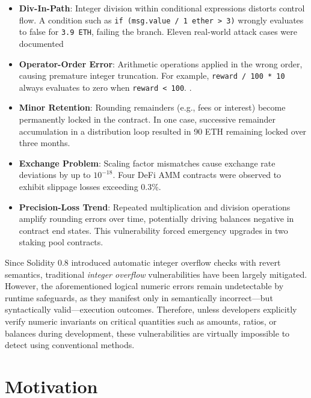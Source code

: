 \documentclass[10pt, conference]{IEEEtran}
\begin{document}
\begin{itemize}
    \item \textbf{Div-In-Path}: Integer division within conditional expressions distorts control flow.  
    A condition such as \texttt{if (msg.value / 1 ether > 3)} wrongly evaluates to false for \texttt{3.9 ETH}, failing the branch. Eleven real-world attack cases were documented
    
    \item \textbf{Operator-Order Error}: Arithmetic operations applied in the wrong order, causing premature integer truncation.  
    For example, \texttt{reward / 100 * 10} always evaluates to zero when \texttt{reward < 100}.    
    .
    
    \item \textbf{Minor Retention}: Rounding remainders (e.g., fees or interest) become permanently locked in the contract.  
    In one case, successive remainder accumulation in a distribution loop resulted in 90 ETH remaining locked over three months.
    
    \item \textbf{Exchange Problem}: Scaling factor mismatches cause exchange rate deviations by up to \(10^{-18}\).  
    Four DeFi AMM contracts were observed to exhibit slippage losses exceeding 0.3\%.
    
    \item \textbf{Precision-Loss Trend}: Repeated multiplication and division operations amplify rounding errors over time, potentially driving balances negative in contract end states.  
    This vulnerability forced emergency upgrades in two staking pool contracts.
\end{itemize}

Since Solidity 0.8 introduced automatic integer overflow checks with revert semantics, traditional \textit{integer overflow} vulnerabilities have been largely mitigated. However, the aforementioned logical numeric errors remain undetectable by runtime safeguards, as they manifest only in semantically incorrect—but syntactically valid—execution outcomes. Therefore, unless developers explicitly verify numeric invariants on critical quantities such as amounts, ratios, or balances during development, these vulnerabilities are virtually impossible to detect using conventional methods.


\section{Motivation}
\end{document}
